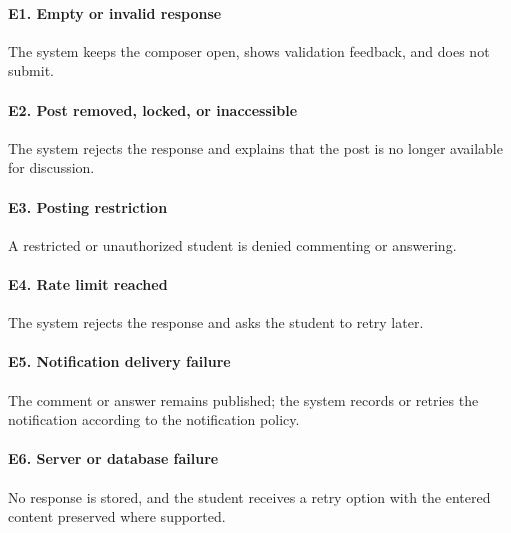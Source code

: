 \documentclass[12pt]{article}
\begin{document}
\paragraph*{E1. Empty or invalid response}
\par\medskip
The system keeps the composer open, shows validation feedback, and does not submit.
\par\medskip
\hypertarget{sec:e2-post-removed-locked-or-inaccessible}{}
\paragraph*{E2. Post removed, locked, or inaccessible}
\par\medskip
The system rejects the response and explains that the post is no longer available for discussion.
\par\medskip
\hypertarget{sec:e3-posting-restriction}{}
\paragraph*{E3. Posting restriction}
\par\medskip
A restricted or unauthorized student is denied commenting or answering.
\par\medskip
\hypertarget{sec:e4-rate-limit-reached}{}
\paragraph*{E4. Rate limit reached}
\par\medskip
The system rejects the response and asks the student to retry later.
\par\medskip
\hypertarget{sec:e5-notification-delivery-failure}{}
\paragraph*{E5. Notification delivery failure}
\par\medskip
The comment or answer remains published; the system records or retries the notification according to the notification policy.
\par\medskip
\hypertarget{sec:e6-server-or-database-failure}{}
\paragraph*{E6. Server or database failure}
\par\medskip
No response is stored, and the student receives a retry option with the entered content preserved where supported.
\par\medskip
\hypertarget{sec:5-4-3-business-rules}{}
\end{document}
